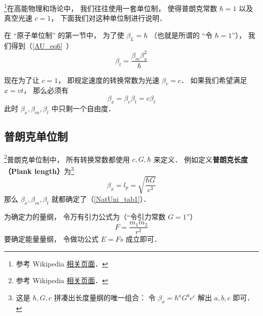 
\begin{issues}
\issueDraft
\end{issues}


\footnote{参考 Wikipedia \href{https://en.wikipedia.org/wiki/Natural_units}{相关页面}．}在高能物理和场论中， 我们往往使用一套单位制， 使得普朗克常数 $\hbar = 1$ 以及真空光速 $c = 1$， 下面我们对这种单位制进行说明．

在 “原子单位制” 的第一节中， 为了使 $\beta_L = \hbar$ （也就是所谓的 “令 $\hbar = 1$”）， 我们得到（\autoref{AU_eq6}~）
\begin{equation}\label{NatUni_eq1}
\beta_t = \frac{\beta_m \beta_x^2}{\hbar}
\end{equation}

现在为了让 $c = 1$， 即规定速度的转换常数为光速 $\beta_v = c$． 如果我们希望满足 $x = vt$， 那么必须有
\begin{equation}
\beta_x = \beta_v \beta _t = c\beta_t
\end{equation}
此时 $\beta_x, \beta_m, \beta_t$ 中只剩一个自由度．

\subsection{普朗克单位制}
\footnote{参考 Wikipedia \href{https://en.wikipedia.org/wiki/Planck_units}{相关页面}．}普朗克单位制中， 所有转换常数都使用 $c, G, \hbar$ 来定义． 例如定义\textbf{普朗克长度（Plank length）}为\footnote{这是 $\hbar, G, c$ 拼凑出长度量纲的唯一组合： 令 $\beta_x = \hbar^a G^b c^c$ 解出 $a, b, c$ 即可．}
\begin{equation}
\beta_x = l_p = \sqrt{\frac{\hbar G}{c^3}}
\end{equation}
那么 $\beta_x, \beta_m, \beta_t$ 就都确定了（\autoref{NatUni_tab1}）．

为确定力的量纲， 令万有引力公式为（“令引力常数 $G = 1$”）
\begin{equation}
F = \frac{m_1 m_2}{r^2}
\end{equation}
要确定能量量纲， 令做功公式 $E = Fs$ 成立即可．


